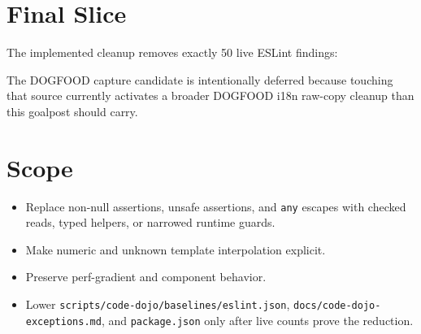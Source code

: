 \section{Final Slice}\label{record-222-final-slice}

The implemented cleanup removes exactly 50 live ESLint findings:



The DOGFOOD capture candidate is intentionally deferred because touching that source currently activates a broader DOGFOOD i18n raw-copy cleanup than this goalpost should carry.

\section{Scope}\label{record-222-scope}

\begin{itemize}
\tightlist
\item
  Replace non-null assertions, unsafe assertions, and \texttt{a\allowbreak{}n\allowbreak{}y} escapes with checked reads, typed helpers, or narrowed runtime guards.
\item
  Make numeric and unknown template interpolation explicit.
\item
  Preserve perf-gradient and component behavior.
\item
  Lower \texttt{s\allowbreak{}c\allowbreak{}r\allowbreak{}i\allowbreak{}p\allowbreak{}t\allowbreak{}s\allowbreak{}/\allowbreak{}c\allowbreak{}o\allowbreak{}d\allowbreak{}e\allowbreak{}-\allowbreak{}d\allowbreak{}o\allowbreak{}j\allowbreak{}o\allowbreak{}/\allowbreak{}b\allowbreak{}a\allowbreak{}s\allowbreak{}e\allowbreak{}l\allowbreak{}i\allowbreak{}n\allowbreak{}e\allowbreak{}s\allowbreak{}/\allowbreak{}e\allowbreak{}s\allowbreak{}l\allowbreak{}i\allowbreak{}n\allowbreak{}t\allowbreak{}.\allowbreak{}j\allowbreak{}s\allowbreak{}o\allowbreak{}n}, \texttt{d\allowbreak{}o\allowbreak{}c\allowbreak{}s\allowbreak{}/\allowbreak{}c\allowbreak{}o\allowbreak{}d\allowbreak{}e\allowbreak{}-\allowbreak{}d\allowbreak{}o\allowbreak{}j\allowbreak{}o\allowbreak{}-\allowbreak{}e\allowbreak{}x\allowbreak{}c\allowbreak{}e\allowbreak{}p\allowbreak{}t\allowbreak{}i\allowbreak{}o\allowbreak{}n\allowbreak{}s\allowbreak{}.\allowbreak{}m\allowbreak{}d}, and \texttt{p\allowbreak{}a\allowbreak{}c\allowbreak{}k\allowbreak{}a\allowbreak{}g\allowbreak{}e\allowbreak{}.\allowbreak{}j\allowbreak{}s\allowbreak{}o\allowbreak{}n} only after live counts prove the reduction.
\end{itemize}

